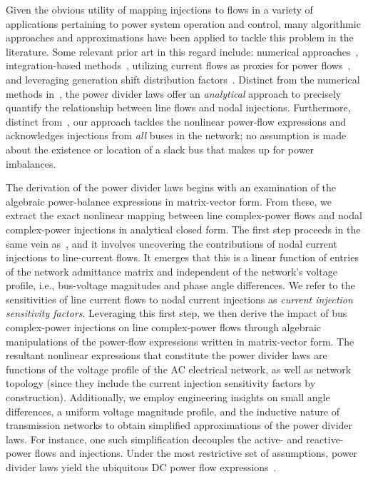 \documentclass[journal]{IEEEtran}
\theoremstyle{definition}
\begin{document}
Given the obvious utility of mapping injections to flows in a variety of applications pertaining to power system operation and control, many algorithmic approaches and approximations have been applied to tackle this problem in the literature. Some relevant prior art in this regard include: numerical approaches~\cite{Kirschen-1997, Bialek:1998}, integration-based methods~\cite{Fradi-2001}, utilizing current flows as proxies for power flows~\cite{Conejo-2007}, and leveraging generation shift distribution factors~\cite{Rudnick:1995, daSilva:2013}. Distinct from the numerical methods in~\cite{Kirschen-1997,Fradi-2001,Bialek:1998, Conejo-2007}, the power divider laws offer an \emph{analytical} approach to precisely quantify the relationship between line flows and nodal injections. Furthermore, distinct from~\cite{Rudnick:1995, daSilva:2013}, our approach tackles the nonlinear power-flow expressions and acknowledges injections from \emph{all} buses in the network; no assumption is made about the existence or location of a slack bus that makes up for power imbalances.

The derivation of the power divider laws begins with an examination of the algebraic power-balance expressions in matrix-vector form. From these, we extract the exact nonlinear mapping between line complex-power flows and nodal complex-power injections in analytical closed form. The first step proceeds in the same vein as~\cite{Conejo-2007}, and it involves uncovering the contributions of nodal current injections to line-current flows. It emerges that this is a linear function  of entries of the network admittance matrix and independent of the network's voltage profile, i.e., bus-voltage magnitudes and phase angle differences. We refer to the sensitivities of line current flows to nodal current injections as \emph{current injection sensitivity factors}. Leveraging this first step, we then derive the impact of bus complex-power injections on line complex-power flows through algebraic manipulations of the power-flow expressions written in matrix-vector form. The resultant nonlinear expressions that constitute the power divider laws are  functions of the voltage profile of the AC electrical network, as well as network topology (since they include the current injection sensitivity factors by construction). Additionally, we employ engineering insights on small angle differences, a uniform voltage magnitude profile, and the inductive nature of transmission networks to obtain simplified approximations of the power divider laws. For instance, one such simplification decouples the active- and reactive-power flows and injections. Under the most restrictive set of assumptions, power divider laws yield the ubiquitous DC power flow expressions~\cite{Glover:2012}.
\end{document}
